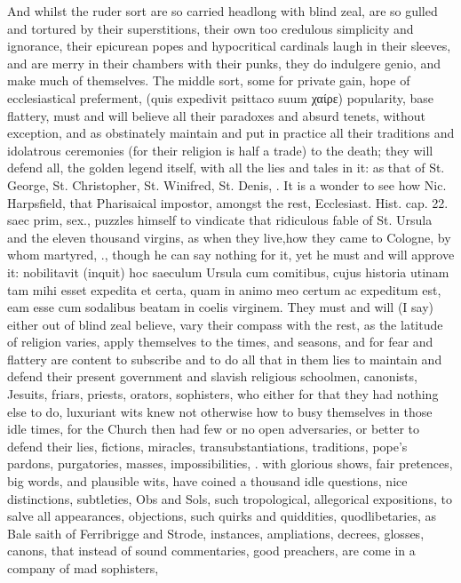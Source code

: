 {And whilst the ruder sort are so carried headlong with blind zeal, are
so gulled and tortured by their superstitions, their own too credulous
simplicity and ignorance, their epicurean popes and hypocritical
cardinals laugh in their sleeves, and are merry in their chambers with
their punks, they do indulgere genio, and make much of themselves. The
middle sort, some for private gain, hope of ecclesiastical preferment,
(quis expedivit psittaco suum χαίρε) popularity, base flattery, must
and will believe all their paradoxes and absurd tenets, without
exception, and as obstinately maintain and put in practice all their
traditions and idolatrous ceremonies (for their religion is half a
trade) to the death; they will defend all, the golden legend itself,
with all the lies and tales in it: as that of St. George, St.
Christopher, St. Winifred, St. Denis, \etc{}. It is a wonder to see how
Nic. Harpsfield, that Pharisaical impostor, amongst the rest,
Ecclesiast. Hist. cap. 22. saec prim, sex., puzzles himself to
vindicate that ridiculous fable of St. Ursula and the eleven thousand
virgins, as when they live,how they came to Cologne, by whom
martyred, \etc{}., though he can say nothing for it, yet he must and will
approve it: nobilitavit (inquit) hoc saeculum Ursula cum comitibus,
cujus historia utinam tam mihi esset expedita et certa, quam in animo
meo certum ac expeditum est, eam esse cum sodalibus beatam in coelis
virginem. They must and will (I say) either out of blind zeal believe,
vary their compass with the rest, as the latitude of religion varies,
apply themselves to the times, and seasons, and for fear and flattery
are content to subscribe and to do all that in them lies to maintain
and defend their present government and slavish religious schoolmen,
canonists, Jesuits, friars, priests, orators, sophisters, who either
for that they had nothing else to do, luxuriant wits knew not otherwise
how to busy themselves in those idle times, for the Church then had few
or no open adversaries, or better to defend their lies, fictions,
miracles, transubstantiations, traditions, pope's pardons, purgatories,
masses, impossibilities, \etc{}. with glorious shows, fair pretences, big
words, and plausible wits, have coined a thousand idle questions, nice
distinctions, subtleties, Obs and Sols, such tropological, allegorical
expositions, to salve all appearances, objections, such quirks and
quiddities, quodlibetaries, as Bale saith of Ferribrigge and Strode,
instances, ampliations, decrees, glosses, canons, that instead of sound
commentaries, good preachers, are come in a company of mad sophisters,
}
